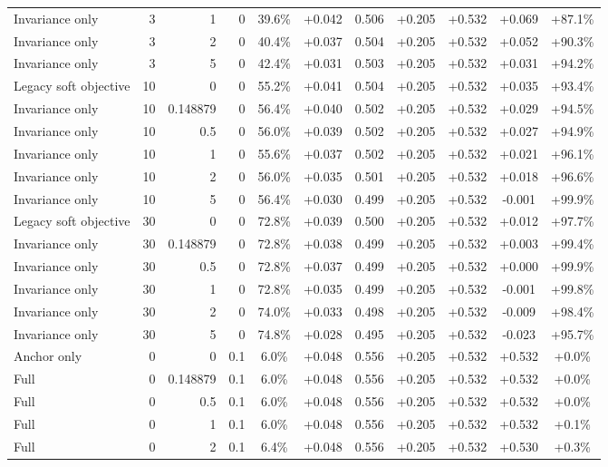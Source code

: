 \begin{table}[htbp]
\begin{tabular}{lrrrccccccc}
Invariance only & 3 & 1 & 0 & 39.6\% & +0.042 & 0.506 & +0.205 & +0.532 & +0.069 & +87.1\% \\
Invariance only & 3 & 2 & 0 & 40.4\% & +0.037 & 0.504 & +0.205 & +0.532 & +0.052 & +90.3\% \\
Invariance only & 3 & 5 & 0 & 42.4\% & +0.031 & 0.503 & +0.205 & +0.532 & +0.031 & +94.2\% \\
Legacy soft objective & 10 & 0 & 0 & 55.2\% & +0.041 & 0.504 & +0.205 & +0.532 & +0.035 & +93.4\% \\
Invariance only & 10 & 0.148879 & 0 & 56.4\% & +0.040 & 0.502 & +0.205 & +0.532 & +0.029 & +94.5\% \\
Invariance only & 10 & 0.5 & 0 & 56.0\% & +0.039 & 0.502 & +0.205 & +0.532 & +0.027 & +94.9\% \\
Invariance only & 10 & 1 & 0 & 55.6\% & +0.037 & 0.502 & +0.205 & +0.532 & +0.021 & +96.1\% \\
Invariance only & 10 & 2 & 0 & 56.0\% & +0.035 & 0.501 & +0.205 & +0.532 & +0.018 & +96.6\% \\
Invariance only & 10 & 5 & 0 & 56.4\% & +0.030 & 0.499 & +0.205 & +0.532 & -0.001 & +99.9\% \\
Legacy soft objective & 30 & 0 & 0 & 72.8\% & +0.039 & 0.500 & +0.205 & +0.532 & +0.012 & +97.7\% \\
Invariance only & 30 & 0.148879 & 0 & 72.8\% & +0.038 & 0.499 & +0.205 & +0.532 & +0.003 & +99.4\% \\
Invariance only & 30 & 0.5 & 0 & 72.8\% & +0.037 & 0.499 & +0.205 & +0.532 & +0.000 & +99.9\% \\
Invariance only & 30 & 1 & 0 & 72.8\% & +0.035 & 0.499 & +0.205 & +0.532 & -0.001 & +99.8\% \\
Invariance only & 30 & 2 & 0 & 74.0\% & +0.033 & 0.498 & +0.205 & +0.532 & -0.009 & +98.4\% \\
Invariance only & 30 & 5 & 0 & 74.8\% & +0.028 & 0.495 & +0.205 & +0.532 & -0.023 & +95.7\% \\
Anchor only & 0 & 0 & 0.1 & 6.0\% & +0.048 & 0.556 & +0.205 & +0.532 & +0.532 & +0.0\% \\
Full & 0 & 0.148879 & 0.1 & 6.0\% & +0.048 & 0.556 & +0.205 & +0.532 & +0.532 & +0.0\% \\
Full & 0 & 0.5 & 0.1 & 6.0\% & +0.048 & 0.556 & +0.205 & +0.532 & +0.532 & +0.0\% \\
Full & 0 & 1 & 0.1 & 6.0\% & +0.048 & 0.556 & +0.205 & +0.532 & +0.532 & +0.1\% \\
Full & 0 & 2 & 0.1 & 6.4\% & +0.048 & 0.556 & +0.205 & +0.532 & +0.530 & +0.3\% \\

\end{tabular}
\end{table}
